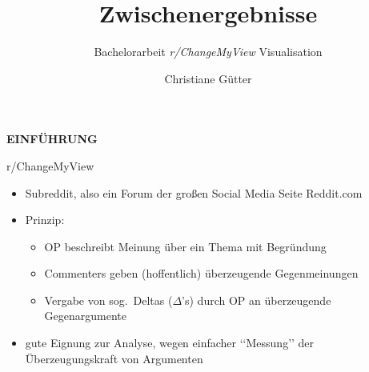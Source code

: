 \documentclass[compress,12pt]{beamer}
\title{Zwischenergebnisse}
\subtitle{Bachelorarbeit \textit{r/ChangeMyView} Visualisation}
\date{}
\author{Christiane Gütter}
\institute{Bauhaus Universität Weimar}
\begin{document}
    \frame[plain]{\titlepage}


    \begin{frame}
        \centering
        \textbf{EINFÜHRUNG}
    \end{frame}

    \begin{frame}{r/ChangeMyView}
        \begin{itemize}
            \item Subreddit, also ein Forum der großen Social Media Seite Reddit.com
            \item Prinzip:
            \begin{itemize}
                \item OP beschreibt Meinung über ein Thema mit Begründung
                \item Commenters geben (hoffentlich) überzeugende Gegenmeinungen
                \item Vergabe von sog.\ Deltas ($\Delta$\rq{}s) durch OP an überzeugende Gegenargumente
            \end{itemize}
            \item gute Eignung zur Analyse, wegen einfacher \lq\lq{}Messung\rq\rq{} der Überzeugungskraft von Argumenten
        \end{itemize}
    \end{frame}
\end{document}
